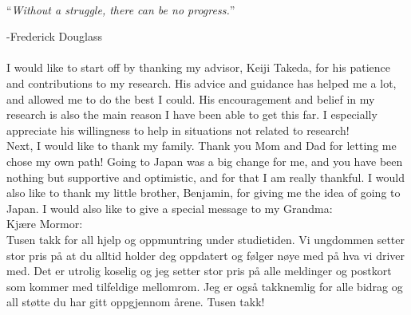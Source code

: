 \documentclass[
11pt, %
english, %
singlespacing, %
headsepline, %
]{MastersDoctoralThesis} %
\begin{document}

\begin{acknowledgements}
\addchaptertocentry{\acknowledgementname} %

\paragraph{}
\paragraph{}
\noindent\enquote{\itshape Without a struggle, there can be no progress.}\bigbreak

\hfill -Frederick Douglass\\
\paragraph{}
%
I would like to start off by thanking my advisor, Keiji Takeda, for his patience and contributions to my research. His advice and guidance has helped me a lot, and allowed me to do the best I could. His encouragement and belief in my research is also the main reason I have been able to get this far. I especially appreciate his willingness to help in situations not related to research!\\

Next, I would like to thank my family. Thank you Mom and Dad for letting me chose my own path! Going to Japan was a big change for me, and you have been nothing but supportive and optimistic, and for that I am really thankful. I would also like to thank my little brother, Benjamin, for giving me the idea of going to Japan. I would also like to give a special message to my Grandma:\\
Kjære Mormor:\\
Tusen takk for all hjelp og oppmuntring under studietiden. Vi ungdommen setter stor pris på at du alltid holder deg oppdatert og følger nøye med på hva vi driver med. Det er utrolig koselig og jeg setter stor pris på alle meldinger og postkort som kommer med tilfeldige mellomrom. Jeg er også takknemlig for alle bidrag og all støtte du har gitt oppgjennom årene. Tusen takk!\\


\end{acknowledgements}
\end{document}
